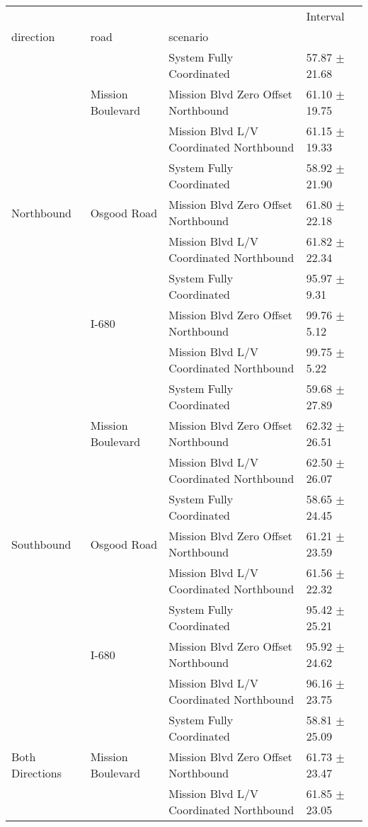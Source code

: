 \begin{tabular}{llll}
\toprule
 &  &  & Interval \\
direction & road & scenario &  \\
\midrule
\multirow[t]{9}{*}{Northbound} & \multirow[t]{3}{*}{Mission Boulevard} & System Fully Coordinated & 57.87 $\pm$ 21.68 \\
 &  & Mission Blvd Zero Offset Northbound & 61.10 $\pm$ 19.75 \\
 &  & Mission Blvd L/V Coordinated Northbound & 61.15 $\pm$ 19.33 \\
 & \multirow[t]{3}{*}{Osgood Road} & System Fully Coordinated & 58.92 $\pm$ 21.90 \\
 &  & Mission Blvd Zero Offset Northbound & 61.80 $\pm$ 22.18 \\
 &  & Mission Blvd L/V Coordinated Northbound & 61.82 $\pm$ 22.34 \\
 & \multirow[t]{3}{*}{I-680} & System Fully Coordinated & 95.97 $\pm$ 9.31 \\
 &  & Mission Blvd Zero Offset Northbound & 99.76 $\pm$ 5.12 \\
 &  & Mission Blvd L/V Coordinated Northbound & 99.75 $\pm$ 5.22 \\
\multirow[t]{9}{*}{Southbound} & \multirow[t]{3}{*}{Mission Boulevard} & System Fully Coordinated & 59.68 $\pm$ 27.89 \\
 &  & Mission Blvd Zero Offset Northbound & 62.32 $\pm$ 26.51 \\
 &  & Mission Blvd L/V Coordinated Northbound & 62.50 $\pm$ 26.07 \\
 & \multirow[t]{3}{*}{Osgood Road} & System Fully Coordinated & 58.65 $\pm$ 24.45 \\
 &  & Mission Blvd Zero Offset Northbound & 61.21 $\pm$ 23.59 \\
 &  & Mission Blvd L/V Coordinated Northbound & 61.56 $\pm$ 22.32 \\
 & \multirow[t]{3}{*}{I-680} & System Fully Coordinated & 95.42 $\pm$ 25.21 \\
 &  & Mission Blvd Zero Offset Northbound & 95.92 $\pm$ 24.62 \\
 &  & Mission Blvd L/V Coordinated Northbound & 96.16 $\pm$ 23.75 \\
\multirow[t]{9}{*}{Both Directions} & \multirow[t]{3}{*}{Mission Boulevard} & System Fully Coordinated & 58.81 $\pm$ 25.09 \\
 &  & Mission Blvd Zero Offset Northbound & 61.73 $\pm$ 23.47 \\
 &  & Mission Blvd L/V Coordinated Northbound & 61.85 $\pm$ 23.05 \\

\end{tabular}
